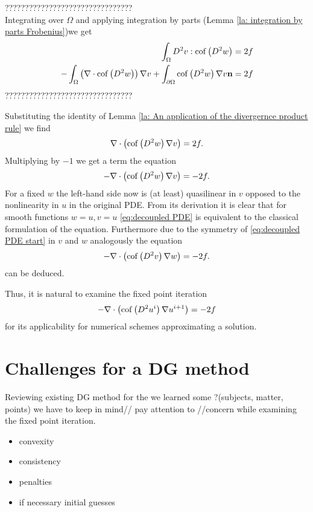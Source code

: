 ???????????????????????????????? \\
Integrating over $\Omega$ and applying integration by parts (Lemma \ref{la: integration by parts Frobenius})we get
\begin{align}
		\int_{\Omega} D^2 v:\operatorname{cof} \left( D^2 w  \right)  &= 2f \\
		-\int_{\Omega} \left( \nabla \cdot \operatorname{cof} \left( D^2 w  \right) \right) \nabla v + \int_{\partial \Omega} \operatorname{cof} \left( D^2 w  \right) \nabla v \mathbf{n} &= 2f
\end{align}
????????????????????????????????


Substituting the identity of Lemma \ref{la: An application of the divergernce product rule} we find
\begin{align}
	\nabla \cdot \left( \operatorname{cof} \left( D^2 w  \right) \nabla v \right) = 2f.
\end{align}
Multiplying by $-1$ we get a term the equation
\begin{align}
	- \nabla \cdot \left( \operatorname{cof} \left(  D^2 w \right) \nabla v \right)  = -2f.  \label{eq:decoupled PDE}
\end{align}
For a fixed $w$ the left-hand side now is (at least) quasilinear in $v$ opposed to the nonlinearity in $u$ in the original PDE. From its derivation it is clear that for smooth functions $w=u, v=u$ \eqref{eq:decoupled PDE} is equivalent to the classical formulation of the \MA equation. Furthermore due to the symmetry of \eqref{eq:decoupled PDE start} in $v$ and $w$ analogously the equation 
\begin{align}
	- \nabla \cdot \left( \operatorname{cof} \left(  D^2 v \right) \nabla w \right)  = -2f.  \label{eq:decoupled PDE two}
\end{align}
can be deduced.

Thus, it is natural to examine the fixed point iteration
\begin{align}
	- \nabla \cdot \left( \operatorname{cof} \left(  D^2 u^i \right) \nabla u^{i+1} \right)  = -2f  \label{eq:fixed point iteration}
\end{align}
for its applicability for numerical schemes approximating a \MA solution.


\section{Challenges for a \MA DG method}
Reviewing existing DG method for the \MA we learned some ?(subjects, matter, points) we have to keep in mind// pay attention to //concern while examining the fixed point iteration.

\begin{itemize}
\item convexity
\item consistency
\item penalties
\item if necessary initial guesses
\end{itemize}

